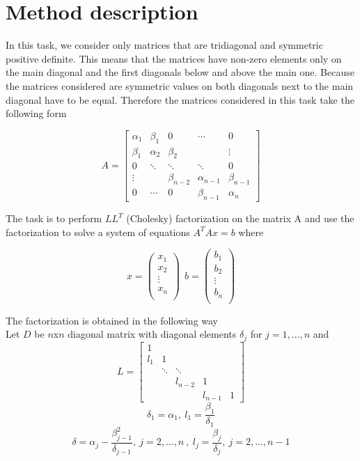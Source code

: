 \documentclass[12pt]{article}
\begin{document}
\maketitle

\section{Method description}

In this task, we consider only matrices that are tridiagonal and symmetric positive definite. This means that the matrices have non-zero elements only on the main diagonal and the first diagonals below and above the main one. Because the matrices considered are symmetric values on both diagonals next to the main diagonal have to be equal. Therefore the matrices considered in this task take the following form

$$
A= \left[
\begin{array}{ccccc}
\alpha_1 & \beta_1 & 0 &\cdots&0\\
\beta_1 & \alpha_2 & \beta_2 & &\vdots\\
0 &\ddots&\ddots&\ddots& 0\\
\vdots&  & \beta_{n-2} & \alpha_{n-1} & \beta_{n-1}\\
0 & \cdots& 0 & \beta_{n-1} & \alpha_n
\end{array}
\right]
$$

The task is to perform $LL^T$ (Cholesky) factorization on the matrix A and use the factorization to solve a system of equations $A^TAx=b$ where 

$$
x=\left(
\begin{array}{c}
x_1\\
x_2\\
\vdots\\
x_n\\
\end{array}
\right)
\ \
b=\left(
\begin{array}{c}
b_1\\
b_2\\
\vdots\\
b_n\\
\end{array}
\right)
$$

The factorization is obtained in the following way\\

Let $D$ be $n$x$n$ diagonal matrix with diagonal elements $\delta_j$ for $j = 1,...,n$ and
$$
L= \left[
\begin{array}{ccccc}
1 &  &  & & \\
l_1 & 1 &   & & \\
  &\ddots&\ddots& &  \\
 &  & l_{n-2} & 1 &  \\
  &  &   & l_{n-1} & 1
\end{array}
\right]
$$
$$\delta_1=\alpha_1, \ l_1=\frac{\beta_1}{\delta_1}$$
$$\delta=\alpha_j-\frac{\beta_{j-1}^2}{\delta_{j-1}},\ j=2,...,n\ ,\ l_j=\frac{\beta_j}{\delta_j},\ j=2,...,n-1$$
\end{document}
